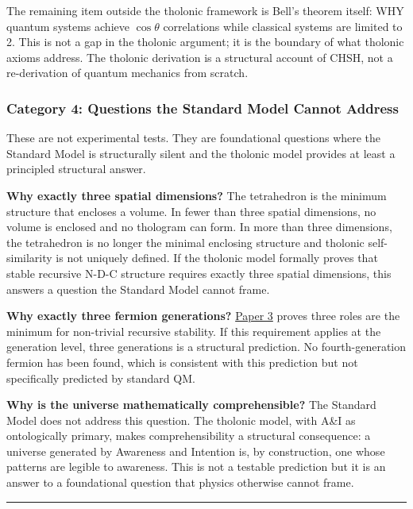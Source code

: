\documentclass[
  11pt,
  letterpaper,
]{article}
\begin{document}
The remaining item outside the tholonic framework is Bell's theorem
itself: WHY quantum systems achieve \(\cos\theta\) correlations while
classical systems are limited to 2. This is not a gap in the tholonic
argument; it is the boundary of what tholonic axioms address. The
tholonic derivation is a structural account of CHSH, not a re-derivation
of quantum mechanics from scratch.

\subsubsection{Category 4: Questions the Standard Model Cannot
Address}\label{category-4-questions-the-standard-model-cannot-address}

These are not experimental tests. They are foundational questions where
the Standard Model is structurally silent and the tholonic model
provides at least a principled structural answer.

\textbf{Why exactly three spatial dimensions?} The tetrahedron is the
minimum structure that encloses a volume. In fewer than three spatial
dimensions, no volume is enclosed and no thologram can form. In more
than three dimensions, the tetrahedron is no longer the minimal
enclosing structure and tholonic self-similarity is not uniquely
defined. If the tholonic model formally proves that stable recursive
N-D-C structure requires exactly three spatial dimensions, this answers
a question the Standard Model cannot frame.

\textbf{Why exactly three fermion generations?}
\href{https://github.com/baardev/truevalue/blob/main/docnav/Research/papers/3_minimal-recursive-triadic-framework/3_minimal-recursive-triadic-framework.pdf}{Paper
3} proves three roles are the minimum for non-trivial recursive
stability. If this requirement applies at the generation level, three
generations is a structural prediction. No fourth-generation fermion has
been found, which is consistent with this prediction but not
specifically predicted by standard QM.

\textbf{Why is the universe mathematically comprehensible?} The Standard
Model does not address this question. The tholonic model, with A\&I as
ontologically primary, makes comprehensibility a structural consequence:
a universe generated by Awareness and Intention is, by construction, one
whose patterns are legible to awareness. This is not a testable
prediction but it is an answer to a foundational question that physics
otherwise cannot frame.

\begin{center}\rule{0.5\linewidth}{0.5pt}\end{center}
\end{document}
